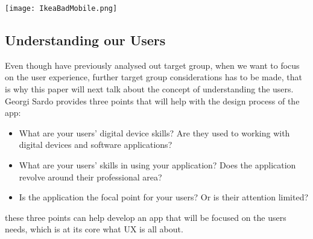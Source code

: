 \centering
\texttt{[image: IkeaBadMobile.png]}
\subsection{Understanding our Users}
Even though have previously analysed out target group, when we want to focus on the user experience, further target group considerations has to be made, that is why this paper will next talk about the concept of understanding the users. Georgi Sardo provides three points that will help with the design process of the app:
\begin{itemize}
\item What are your users’ digital device skills? Are they used to working with digital devices and software applications?\cite{Sardo}
\item What are your users’ skills in using your application? Does the application revolve around their professional area?\cite{Sardo}
\item Is the application the focal point for your users? Or is their attention limited?\cite{Sardo}
\end{itemize}
these three points can help develop an app that will be focused on the users needs, which is at its core what UX is all about.